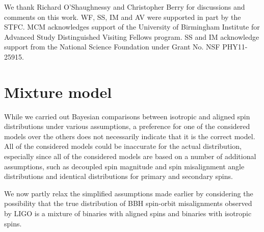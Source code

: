 \documentclass[modern,linenumbers]{aastex61}
\newcommand{\chieff}{\chi_\mathrm{eff}}
\begin{document}


\acknowledgements

We thank Richard O'Shaughnessy and Christopher Berry for discussions and
comments on this work.  WF, SS, IM and AV were supported in part by the STFC.  MCM acknowledges support of the University of
Birmingham Institute for Advanced Study Distinguished Visiting Fellows
program.   SS and IM acknowledge support from the National Science Foundation under Grant No. NSF PHY11-25915.

\appendix

\section{Mixture model}

While we carried out Bayesian comparisons between isotropic and aligned spin distributions under various assumptions, a preference for one of the considered models over the others does not necessarily indicate that it is the correct model.  All of the considered models could be inaccurate for the actual distribution, especially since all of the considered models are based on a number of additional assumptions, such as decoupled spin magnitude and spin misalignment angle distributions and identical distributions for primary and secondary spins.

We now partly relax the simplified assumptions made earlier by considering the possibility that the true distribution of BBH spin-orbit misalignments observed by LIGO is a mixture of binaries with aligned spins and binaries with isotropic spins.
\end{document}
